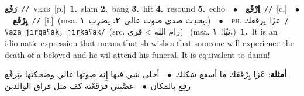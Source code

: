 \documentclass[10pt,a4paper,twoside]{article} %
\begin{document}
\begin{multicols}{2}
{\setlength\topsep{0pt}\textbf{\foreignlanguage{arabic}{رَقَع}}\ {\color{gray}\texttt{//}\color{black}}\ \textsc{verb}\ [p.]\ \textbf{1.}~slam  \textbf{2.}~bang  \textbf{3.}~hit  \textbf{4.}~resound  \textbf{5.}~echo\ \ $\bullet$\ \ \setlength\topsep{0pt}\textbf{\foreignlanguage{arabic}{اِرْقَع}}\ {\color{gray}\texttt{//}\color{black}}\ [c.]\ \ $\bullet$\ \ \setlength\topsep{0pt}\textbf{\foreignlanguage{arabic}{يِرْقَع}}\ {\color{gray}\texttt{//}\color{black}}\ [i.]\ \color{gray}(msa. \foreignlanguage{arabic}{يحدِث صدى صوت عالي}~\foreignlanguage{arabic}{\textbf{٢.}}  \foreignlanguage{arabic}{يضرِب}~\foreignlanguage{arabic}{\textbf{١.}})\color{black}\ \ $\bullet$\ \ \textsc{ph.} \color{gray} \foreignlanguage{arabic}{عزَا يرقعك}\color{black}\ {\color{gray}\texttt{/{\sffamily ʕaza jirqaʕak, jirkaʕak}/}\color{black}}\ \color{gray}(src. \foreignlanguage{arabic}{رام الله > قرى})\color{black}\ \color{gray} (msa. \foreignlanguage{arabic}{تبّا!}~\foreignlanguage{arabic}{\textbf{١.}})\color{black}\ \textbf{1.}~It is an idiomatic expression that means that sb wishes that someone will experience the death of a beloved and he wil attend his funeral. It is equivalent to damn!\  \begin{flushright}\color{gray}\foreignlanguage{arabic}{\textbf{\underline{\foreignlanguage{arabic}{أمثلة}}}: عَزا يِرْقَعَك ما أسقع شكلك\ $\bullet$\ \  أحلى شي فيها إِنه صوتها عالي وضحكتها بتِرقْع رقِع بالمكان\ $\bullet$\ \  عصَّبني فرَقَعْته كف مثل فراق الوالدين}\end{flushright}\color{black}} \vspace{2mm}


\end{multicols}
\end{document}

